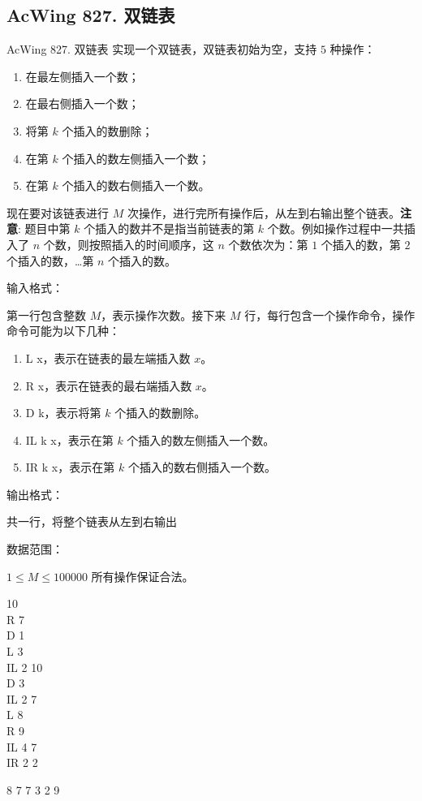 \subsection{AcWing 827. 双链表}
\begin{titledbox}{AcWing 827. 双链表}
实现一个双链表，双链表初始为空，支持 $5$ 种操作：

\begin{enumerate}
    \itemsep=-5pt
    \item 在最左侧插入一个数；
    \item 在最右侧插入一个数；
    \item 将第 $k$ 个插入的数删除；
    \item 在第 $k$ 个插入的数左侧插入一个数；
    \item 在第 $k$ 个插入的数右侧插入一个数。
\end{enumerate}

现在要对该链表进行 $M$ 次操作，进行完所有操作后，从左到右输出整个链表。\textbf{注意}: 题目中第 $k$ 个插入的数并不是指当前链表的第 $k$ 个数。例如操作过程中一共插入了 $n$ 个数，则按照插入的时间顺序，这 $n$ 个数依次为：第 $1$ 个插入的数，第 $2$ 个插入的数，…第 $n$ 个插入的数。

输入格式：

第一行包含整数 $M$，表示操作次数。接下来 $M$ 行，每行包含一个操作命令，操作命令可能为以下几种：

\begin{enumerate}
    \itemsep=-5pt
    \item L x，表示在链表的最左端插入数 $x$。
    \item R x，表示在链表的最右端插入数 $x$。
    \item D k，表示将第 $k$ 个插入的数删除。
    \item IL k x，表示在第 $k$ 个插入的数左侧插入一个数。
    \item IR k x，表示在第 $k$ 个插入的数右侧插入一个数。
\end{enumerate}

输出格式：

共一行，将整个链表从左到右输出

数据范围：

$1 \le M \le 100000$ 所有操作保证合法。

\begin{inputblock}
    10 \\
    R 7 \\
    D 1 \\
    L 3 \\
    IL 2 10 \\
    D 3 \\
    IL 2 7 \\
    L 8 \\
    R 9 \\
    IL 4 7 \\
    IR 2 2
\end{inputblock}
\begin{outputblock}
    8 7 7 3 2 9
\end{outputblock}
\end{titledbox}

